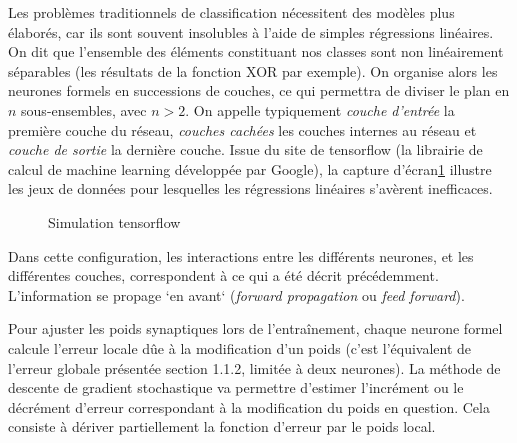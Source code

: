 \documentclass[12pt]{report}
\begin{document}
Les problèmes traditionnels de classification nécessitent des modèles plus élaborés, car ils sont souvent insolubles à l'aide de simples régressions linéaires. On dit que l'ensemble des éléments constituant nos classes
sont non linéairement séparables (les résultats de la fonction XOR par exemple). On organise alors les neurones formels en successions de couches, ce qui permettra de diviser le plan en $n$ sous-ensembles, avec $n >2$.
On appelle typiquement \textit{couche d'entrée} la première couche du réseau, \textit{couches cachées} les couches internes au réseau et \textit{couche de sortie} la dernière couche.
Issue du site de tensorflow\cite{Bib_PlaygroundTF} (la librairie de calcul de machine learning développée par Google\cite{Bib_TenFlo}), la capture d'écran\ref{fig:c1p2s2} illustre les jeux de données pour lesquelles les régressions linéaires s'avèrent inefficaces.

\begin{figure}[H]
    \centering
    \caption{Simulation tensorflow}
    \label{fig:c1p2s2}
\end{figure}


Dans cette configuration, les interactions entre les différents neurones, et les différentes couches, correspondent à ce qui a été décrit précédemment. L'information se propage `en avant` (\textit{forward propagation} ou \textit{feed forward}).
\par
Pour ajuster les poids synaptiques lors de l'entraînement, chaque neurone formel calcule l'erreur locale dûe à la modification d'un poids (c'est l'équivalent de l'erreur globale présentée section 1.1.2, limitée à deux neurones).
La méthode de descente de gradient stochastique\cite{Bib_WikiSGD} va permettre d'estimer l'incrément ou le décrément d'erreur correspondant à la modification du poids en question. Cela consiste à dériver partiellement la fonction d'erreur par le poids local.
\end{document}

